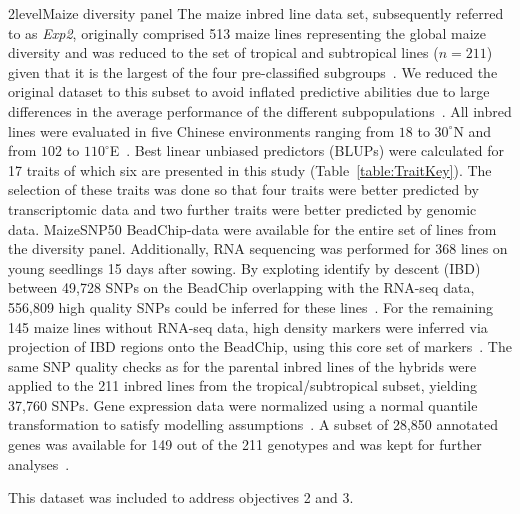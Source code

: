 \documentclass[12pt,titlepage]{article}
\begin{document}
\Genetics2level{Maize diversity panel}
The maize inbred line data set, subsequently referred to as \textit{Exp2}, 
originally comprised 513 maize lines representing the global maize diversity 
and was reduced to the set of tropical and subtropical lines ($n = 211$) given 
that it is the largest of the four pre-classified subgroups~\cite{Yang2014}.
We reduced the original dataset to this subset to avoid inflated predictive 
abilities due to large differences in the average performance of the different
subpopulations~\cite{Windhausen2012}.
All inbred lines were evaluated in five Chinese environments ranging from
$18$ to $30^{\circ}$N and from $102$ to $110^{\circ}$E~\cite{Yang2014}.
Best linear unbiased predictors (BLUPs) were calculated for 17 traits of which 
six are presented in this study (Table~\ref{table:TraitKey}).
The selection of these traits was done so that four traits were better 
predicted by transcriptomic data and two further traits were better predicted 
by genomic data.
MaizeSNP50 BeadChip-data were available for the entire set of lines from the
diversity panel.
Additionally, RNA sequencing was performed for 368 lines on young seedlings 15 
days after sowing.
By exploting identify by descent (IBD) between 49,728 SNPs on the BeadChip 
overlapping with the RNA-seq data, 556,809 high quality SNPs could be inferred 
for these lines~\cite{Fu2013,Li2013}.
For the remaining 145 maize lines without RNA-seq data, high density markers
were inferred via projection of IBD regions onto the BeadChip, using this core 
set of markers~\cite{Yang2014}.
The same SNP quality checks as for the parental inbred lines of the hybrids
were applied to the 211 inbred lines from the tropical/subtropical subset,
yielding 37,760 SNPs.
Gene expression data were normalized using a normal quantile transformation to
satisfy modelling assumptions~\cite{Fu2013}.
A subset of 28,850 annotated genes was available for 149 out of the 211
genotypes and was kept for further analyses~\cite{Li2013}.

This dataset was included to address objectives 2 and 3.
\end{document}
